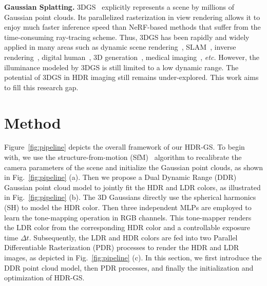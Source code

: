 \documentclass{article}
\begin{document}
\vspace{1mm}
\noindent\textbf{Gaussian Splatting.} 3DGS~\cite{3dgs} explicitly represents a scene by millions of Gaussian point clouds. Its parallelized rasterization in view rendering allows it to enjoy much faster inference speed than NeRF-based methods that suffer from the time-consuming ray-tracing scheme. Thus, 3DGS has been rapidly and widely applied in many areas such as dynamic scene rendering~\cite{dynamic3,dynamic1,dynamic2}, SLAM~\cite{slam3,slam4,slam2,slam1}, inverse rendering~\cite{InverseRendering2,InverseRendering3,InverseRendering1}, digital human~\cite{humangaussian,hugs,gauhuman}, 3D generation~\cite{dreamgaussian,gaussiandreamer,luciddreamer}, medical imaging~\cite{x_gaussian,r2gs}, \emph{etc.} However, the illuminance modeled by 3DGS is still limited to a low dynamic range. The potential of 3DGS in HDR imaging still remains under-explored. This work aims to fill this research gap.


\section{Method} \label{sec:method}
Figure~\ref{fig:pipeline} depicts the overall framework of our HDR-GS. To begin with, we use the structure-from-motion (SfM)~\cite{sfm} algorithm to recalibrate the camera parameters of the scene and initialize the Gaussian point clouds, as shown in Fig.~\ref{fig:pipeline} (a). Then we propose a Dual Dynamic Range (DDR) Gaussian point cloud model to jointly fit the HDR and LDR colors, as illustrated in Fig.~\ref{fig:pipeline} (b). The 3D Gaussians directly use the spherical harmonics (SH) to model the HDR color. Then three independent MLPs are employed to learn the tone-mapping operation in RGB channels. This tone-mapper renders the LDR color from the corresponding HDR color and a controllable exposure time $\Delta t$. Subsequently, the LDR and HDR colors are fed into two Parallel Differentiable Rasterization (PDR) processes to render the HDR and LDR images, as depicted in Fig.~\ref{fig:pipeline} (c). In this section, we first introduce the DDR point cloud model, then PDR processes, and finally the initialization and optimization of HDR-GS.
\end{document}
